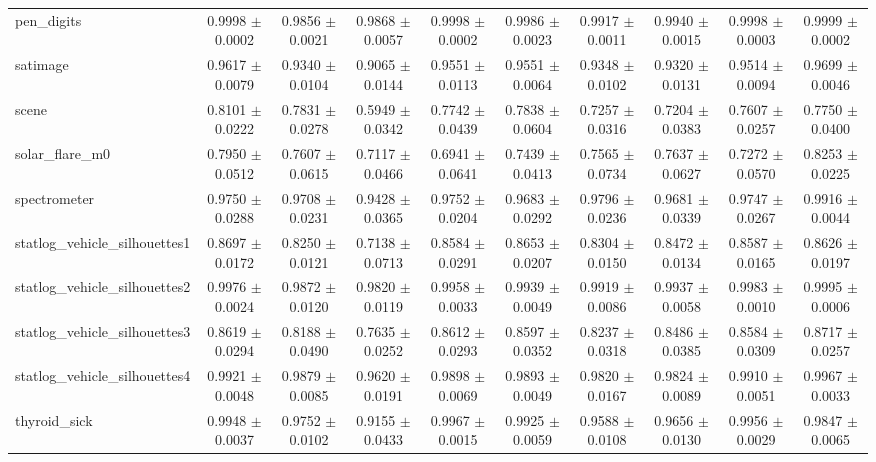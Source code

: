 \begin{table*}[htbp]
\begin{tabular}{lccccccccc}
            pen\_digits & 0.9998 $\pm$ 0.0002 & 0.9856 $\pm$ 0.0021 & 0.9868 $\pm$ 0.0057 & 0.9998 $\pm$ 0.0002 & 0.9986 $\pm$ 0.0023 & 0.9917 $\pm$ 0.0011 & 0.9940 $\pm$ 0.0015 & 0.9998 $\pm$ 0.0003 & 0.9999 $\pm$ 0.0002 \\ 
            satimage & 0.9617 $\pm$ 0.0079 & 0.9340 $\pm$ 0.0104 & 0.9065 $\pm$ 0.0144 & 0.9551 $\pm$ 0.0113 & 0.9551 $\pm$ 0.0064 & 0.9348 $\pm$ 0.0102 & 0.9320 $\pm$ 0.0131 & 0.9514 $\pm$ 0.0094 & 0.9699 $\pm$ 0.0046 \\ 
            scene & 0.8101 $\pm$ 0.0222 & 0.7831 $\pm$ 0.0278 & 0.5949 $\pm$ 0.0342 & 0.7742 $\pm$ 0.0439 & 0.7838 $\pm$ 0.0604 & 0.7257 $\pm$ 0.0316 & 0.7204 $\pm$ 0.0383 & 0.7607 $\pm$ 0.0257 & 0.7750 $\pm$ 0.0400 \\ 
            solar\_flare\_m0 & 0.7950 $\pm$ 0.0512 & 0.7607 $\pm$ 0.0615 & 0.7117 $\pm$ 0.0466 & 0.6941 $\pm$ 0.0641 & 0.7439 $\pm$ 0.0413 & 0.7565 $\pm$ 0.0734 & 0.7637 $\pm$ 0.0627 & 0.7272 $\pm$ 0.0570 & 0.8253 $\pm$ 0.0225 \\ 
            spectrometer & 0.9750 $\pm$ 0.0288 & 0.9708 $\pm$ 0.0231 & 0.9428 $\pm$ 0.0365 & 0.9752 $\pm$ 0.0204 & 0.9683 $\pm$ 0.0292 & 0.9796 $\pm$ 0.0236 & 0.9681 $\pm$ 0.0339 & 0.9747 $\pm$ 0.0267 & 0.9916 $\pm$ 0.0044 \\ 
            statlog\_vehicle\_silhouettes1 & 0.8697 $\pm$ 0.0172 & 0.8250 $\pm$ 0.0121 & 0.7138 $\pm$ 0.0713 & 0.8584 $\pm$ 0.0291 & 0.8653 $\pm$ 0.0207 & 0.8304 $\pm$ 0.0150 & 0.8472 $\pm$ 0.0134 & 0.8587 $\pm$ 0.0165 & 0.8626 $\pm$ 0.0197 \\ 
            statlog\_vehicle\_silhouettes2 & 0.9976 $\pm$ 0.0024 & 0.9872 $\pm$ 0.0120 & 0.9820 $\pm$ 0.0119 & 0.9958 $\pm$ 0.0033 & 0.9939 $\pm$ 0.0049 & 0.9919 $\pm$ 0.0086 & 0.9937 $\pm$ 0.0058 & 0.9983 $\pm$ 0.0010 & 0.9995 $\pm$ 0.0006 \\ 
            statlog\_vehicle\_silhouettes3 & 0.8619 $\pm$ 0.0294 & 0.8188 $\pm$ 0.0490 & 0.7635 $\pm$ 0.0252 & 0.8612 $\pm$ 0.0293 & 0.8597 $\pm$ 0.0352 & 0.8237 $\pm$ 0.0318 & 0.8486 $\pm$ 0.0385 & 0.8584 $\pm$ 0.0309 & 0.8717 $\pm$ 0.0257 \\ 
            statlog\_vehicle\_silhouettes4 & 0.9921 $\pm$ 0.0048 & 0.9879 $\pm$ 0.0085 & 0.9620 $\pm$ 0.0191 & 0.9898 $\pm$ 0.0069 & 0.9893 $\pm$ 0.0049 & 0.9820 $\pm$ 0.0167 & 0.9824 $\pm$ 0.0089 & 0.9910 $\pm$ 0.0051 & 0.9967 $\pm$ 0.0033 \\ 
            thyroid\_sick & 0.9948 $\pm$ 0.0037 & 0.9752 $\pm$ 0.0102 & 0.9155 $\pm$ 0.0433 & 0.9967 $\pm$ 0.0015 & 0.9925 $\pm$ 0.0059 & 0.9588 $\pm$ 0.0108 & 0.9656 $\pm$ 0.0130 & 0.9956 $\pm$ 0.0029 & 0.9847 $\pm$ 0.0065 \\ 

\end{tabular}
\end{table*}
